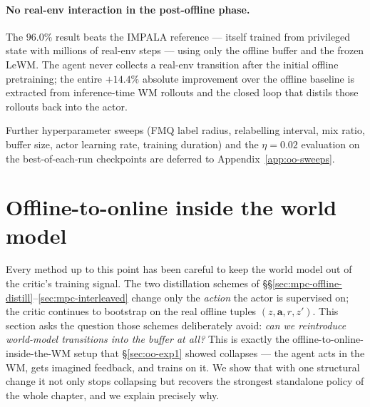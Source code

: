 \paragraph{No real-env interaction in the post-offline phase.} The $96.0\%$ result beats the IMPALA reference --- itself trained from privileged state with millions of real-env steps --- using only the offline buffer and the frozen LeWM. The agent never collects a real-env transition after the initial offline pretraining; the entire $+14.4\%$ absolute improvement over the offline baseline is extracted from inference-time WM rollouts and the closed loop that distils those rollouts back into the actor.

Further hyperparameter sweeps (FMQ label radius, relabelling interval, mix ratio, buffer size, actor learning rate, training duration) and the $\eta = 0.02$ evaluation on the best-of-each-run checkpoints are deferred to Appendix~\ref{app:oo-sweeps}.

\section{Offline-to-online inside the world model}
\label{sec:mpc-online-wm}

Every method up to this point has been careful to keep the world model out of the critic's training signal. The two distillation schemes of \S\S\ref{sec:mpc-offline-distill}--\ref{sec:mpc-interleaved} change only the \emph{action} the actor is supervised on; the critic continues to bootstrap on the real offline tuples $(z, \mathbf{a}, r, z')$. This section asks the question those schemes deliberately avoid: \emph{can we reintroduce world-model transitions into the buffer at all?} This is exactly the offline-to-online-inside-the-WM setup that \S\ref{sec:oo-exp1} showed collapses --- the agent acts in the WM, gets imagined feedback, and trains on it. We show that with one structural change it not only stops collapsing but recovers the strongest standalone policy of the whole chapter, and we explain precisely why.

